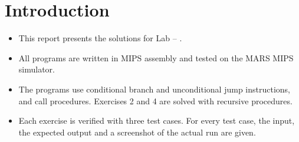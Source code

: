 \section{Introduction}
\begin{itemize}[itemsep=6pt]
  \item This report presents the solutions for Lab \LabNumber{} -- \textit{\LabTitle}.
  \item All programs are written in MIPS assembly and tested on the MARS MIPS simulator.
  \item The programs use conditional branch and unconditional jump instructions,
        and call procedures. Exercises 2 and 4 are solved with recursive procedures.
  \item Each exercise is verified with three test cases. For every test case, the input,
        the expected output and a screenshot of the actual run are given.
\end{itemize}
